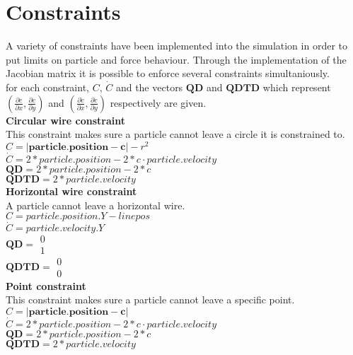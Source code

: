 \chapter{Constraints}
A variety of constraints have been implemented into the simulation in order to put limits on particle and force behaviour. Through the implementation of the Jacobian matrix it is possible to enforce several constraints simultaniously. \\
for each constraint, $C$, $\dot{C}$ and the vectors $\boldsymbol{QD}$ and $\boldsymbol{QDTD}$ which represent $(\frac{\partial c}{\partial x}, \frac{\partial c}{\partial y})$ and $(\frac{\partial\dot{c}}{\partial x}, \frac{\partial \dot{c}}{\partial y})$ respectively are given.  \\ 

\smallskip
\textbf{Circular wire constraint} \\
This constraint makes sure a particle cannot leave a circle it is constrained to. \\
$C = |\boldsymbol{particle.position} - \boldsymbol{c}| - r^2$ 
$\dot{C} =2 * particle.position - 2 * c \cdot particle.velocity$ \\
$\boldsymbol{QD} = 2*particle.position - 2*c$ \\
$\boldsymbol{QDTD}= 2*particle.velocity$\\

\smallskip
\textbf{Horizontal wire constraint} \\
A particle cannot leave a horizontal wire. \\
$C = particle.position.Y -linepos$ \\
$\dot{C} = particle.velocity.Y$ \\
$\boldsymbol{QD} =\begin{matrix} 0 \\ 1  \end{matrix}$ \\
$\boldsymbol{QDTD}=\begin{matrix} 0 \\ 0  \end{matrix}$ \\

\pagebreak
\textbf{Point constraint} \\
This constraint makes sure a particle cannot leave a specific point.\\
$C = |\boldsymbol{particle.position} - \boldsymbol{c}|$ \\
$\dot{C} =2 * particle.position - 2 * c \cdot particle.velocity$ \\
$\boldsymbol{QD} = 2*particle.position - 2*c$ \\
$\boldsymbol{QDTD}= 2*particle.velocity$\\

